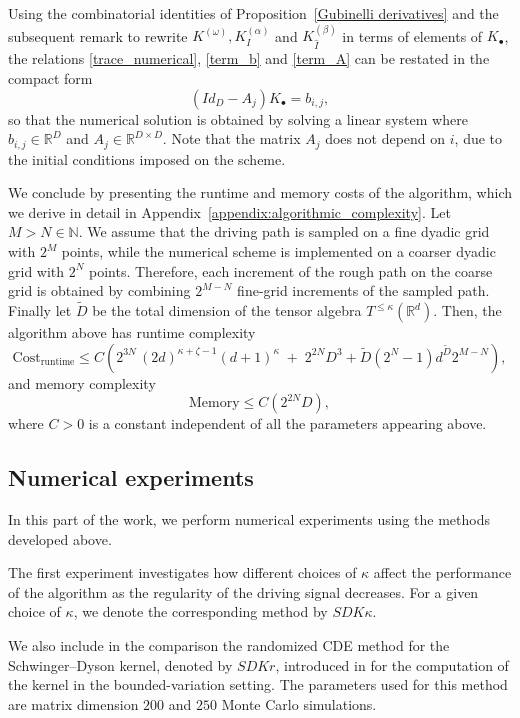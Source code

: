 \documentclass{article}%
\begin{document}
Using the combinatorial identities of Proposition~\ref{Gubinelli derivatives} and the subsequent remark to rewrite $K^{(\omega)}, K^{(\alpha)}_I$ and $K^{(\beta)}_{\hat{I}}$ in terms of elements of $K_\bullet$, the relations \eqref{trace_numerical}, \eqref{term_b} and \eqref{term_A} can be restated in the compact form
\[
(Id_D - A_j) K_{\bullet} = b_{i,j},
\]
so that the numerical solution is obtained by solving a linear system where $b_{i,j} \in \mathbb{R}^D$ and $A_j \in \mathbb{R}^{D \times D}$. Note that the matrix $A_j$ does not depend on $i$, due to the initial conditions imposed on the scheme.\newline

We conclude by presenting the runtime and memory costs of the algorithm, which we derive in detail in Appendix~\ref{appendix:algorithmic_complexity}.
Let \(M>N\in\mathbb N\). We assume that the driving path is sampled on a fine dyadic grid with \(2^M\) points, while the numerical scheme is implemented on a coarser dyadic grid with \(2^N\) points. Therefore, each increment of the rough path on the coarse grid is obtained by combining \(2^{M-N}\) fine-grid increments of the sampled path. Finally let $\tilde{D}$ be the total dimension of the tensor algebra $T^{\le \kappa }(\mathbb{R}^d)$. Then, the algorithm above has runtime complexity
\[
\mathrm{Cost}_{\mathrm{runtime}} \leq C\left(
2^{3N}\,(2d)^{\kappa + \zeta -1} (d+1)^\kappa \;+\; 2^{2N} D^3 + \tilde{D}(2^N - 1)d^{\tilde{D}} 2^{M-N}
\right),
\]
and memory complexity
\[
\mathrm{Memory} \leq C\left(2^{2N} D\right),
\]
where \(C>0\) is a constant independent of all the parameters appearing above.

\subsection{Numerical experiments}
In this part of the work, we perform numerical experiments using the methods developed above.

The first experiment investigates how different choices of \(\kappa\) affect the performance of the algorithm as the regularity of the driving signal decreases. For a given choice of \(\kappa\), we denote the corresponding method by \(SDK\kappa\).

We also include in the comparison the randomized CDE method for the Schwinger--Dyson kernel, denoted by \(SDKr\), introduced in \cite{cass2024free} for the computation of the kernel in the bounded-variation setting. The parameters used for this method are matrix dimension \(200\) and \(250\) Monte Carlo simulations.
\end{document}
